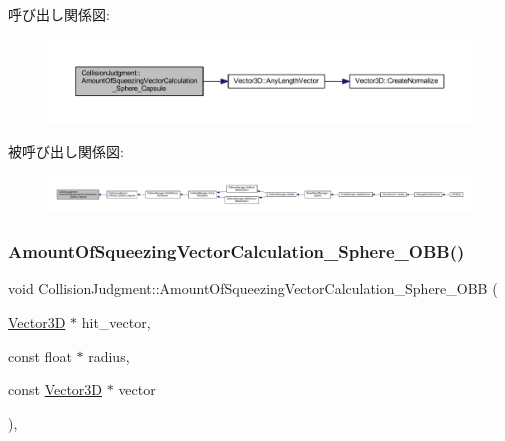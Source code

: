 呼び出し関係図\+:\nopagebreak
\begin{figure}[H]
\begin{center}
\leavevmode
\includegraphics[width=350pt]{class_collision_judgment_ae992df185735a5348aef01754ebf9b80_cgraph}
\end{center}
\end{figure}
被呼び出し関係図\+:
\nopagebreak
\begin{figure}[H]
\begin{center}
\leavevmode
\includegraphics[width=350pt]{class_collision_judgment_ae992df185735a5348aef01754ebf9b80_icgraph}
\end{center}
\end{figure}
\mbox{\label{class_collision_judgment_a0d9af21fba97d2f396c8200b6fccaeb4}} 
\subsubsection{\texorpdfstring{Amount\+Of\+Squeezing\+Vector\+Calculation\+\_\+\+Sphere\+\_\+\+O\+B\+B()}{AmountOfSqueezingVectorCalculation\_Sphere\_OBB()}}
{\footnotesize\ttfamily void Collision\+Judgment\+::\+Amount\+Of\+Squeezing\+Vector\+Calculation\+\_\+\+Sphere\+\_\+\+O\+BB (\begin{DoxyParamCaption}\item[{\mbox{\hyperlink{class_vector3_d}{Vector3D}} $\ast$}]{hit\+\_\+vector,  }\item[{const float $\ast$}]{radius,  }\item[{const \mbox{\hyperlink{class_vector3_d}{Vector3D}} $\ast$}]{vector }\end{DoxyParamCaption})\hspace{0.3cm}{\ttfamily [static]}, {\ttfamily [private]}}



